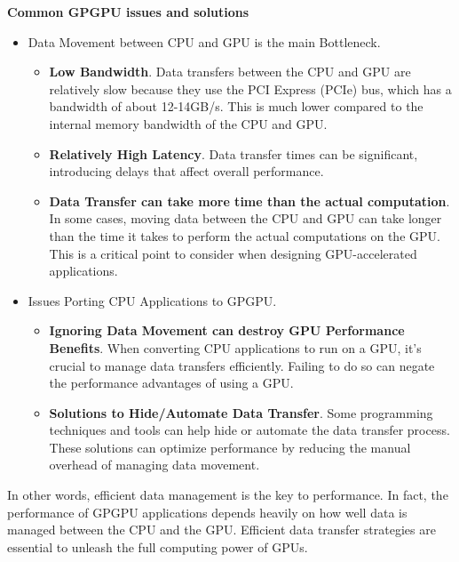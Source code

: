 \begin{flushleft}
    \textcolor{Green3}{ \textbf{Common GPGPU issues and solutions}}
\end{flushleft}
\begin{itemize}
    \item Data Movement between CPU and GPU is the main Bottleneck.
    \begin{itemize}
        \item \textbf{Low Bandwidth}. Data transfers between the CPU and GPU are relatively slow because they use the PCI Express (PCIe) bus, which has a bandwidth of about 12-14GB/s. This is much lower compared to the internal memory bandwidth of the CPU and GPU.

        \item \textbf{Relatively High Latency}. Data transfer times can be significant, introducing delays that affect overall performance.

        \item \textbf{Data Transfer can take more time than the actual computation}. In some cases, moving data between the CPU and GPU can take longer than the time it takes to perform the actual computations on the GPU. This is a critical point to consider when designing GPU-accelerated applications.
    \end{itemize}

    \item Issues Porting CPU Applications to GPGPU.
    \begin{itemize}
        \item \textbf{Ignoring Data Movement can destroy GPU Performance Benefits}. When converting CPU applications to run on a GPU, it's crucial to manage data transfers efficiently. Failing to do so can negate the performance advantages of using a GPU.

        \item \textbf{Solutions to Hide/Automate Data Transfer}. Some programming techniques and tools can help hide or automate the data transfer process. These solutions can optimize performance by reducing the manual overhead of managing data movement.
    \end{itemize}
\end{itemize}
In other words, efficient data management is the key to performance. In fact, the performance of GPGPU applications depends heavily on how well data is managed between the CPU and the GPU. Efficient data transfer strategies are essential to unleash the full computing power of GPUs.
